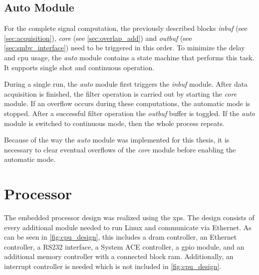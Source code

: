 \documentclass[12pt,a4paper,parskip=full,abstract=true,BCOR=12mm]{scrreprt}
\def\device#1{\mbox{\textit{#1}}}
\begin{document}

\subsection{Auto Module}
\label{sec:auto}

For the complete signal computation, the previously described blocks
\device{inbuf} (see \cref{sec:acquisition}), \device{core} (see
\cref{sec:overlap_add}) and \device{outbuf} (see \cref{sec:smbv_interface})
need to be triggered in this order. To minimize the delay and \gls{cpu}
usage, the \device{auto} module contains a state machine that performs
this task. It supports single shot and continuous operation.

During a single run, the \device{auto} module first triggers the \device{inbuf}
module. After data acquisition is finished, the filter operation is carried out
by starting the \device{core} module. If an overflow occurs during these
computations, the automatic mode is stopped. After a successful filter
operation the \device{outbuf} buffer is toggled. If the \device{auto} module
is switched to continuous mode, then the whole process repeats.

Because of the way the \device{auto} module was implemented for this thesis,
it is necessary to clear eventual overflows of the \device{core} module before
enabling the automatic mode.


\section{Processor}
\label{sec:processor}

The embedded processor design was realized using the \gls{xps}. The
design consists of every additional module needed
to run Linux and communicate via Ethernet. As can be seen in
\cref{fig:cpu_design}, this includes a \gls{dram} controller, an
Ethernet controller, a RS232 interface, a System ACE controller,
a \gls{gpio} module, and an additional memory controller with a connected
block \gls{ram}. Additionally, an interrupt controller is needed which is
not included in \cref{fig:cpu_design}.
\end{document}
